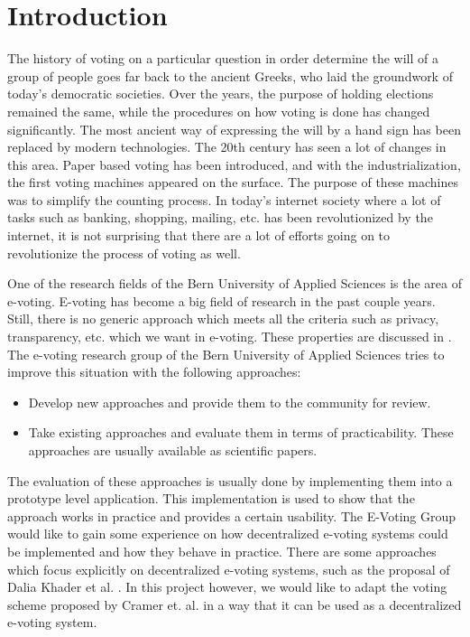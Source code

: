 \documentclass[numbers=noenddot, abstract=on, a4paper, headsepline,
footsepline, oneside, draft=off]{scrreprt}
\begin{document}
\printnomenclature

\chapter{Introduction}
\label{cha:introduction}
The history of voting on a particular question in order determine the will of a
group of people goes far back to the ancient Greeks, who laid the groundwork of
today's democratic societies. Over the years, the purpose of holding elections
remained the same, while the procedures on how voting is done has changed
significantly. The most ancient way of expressing the will by a hand sign has
been replaced by modern technologies. The 20th century has seen a lot of changes
in this area. Paper based voting has been introduced, and with the
industrialization, the first voting machines appeared on the surface. The
purpose of these machines was to simplify the counting process. In today's internet
society where a lot of tasks such as banking, shopping, mailing, etc. has been
revolutionized by the internet, it is not surprising that there are a lot of
efforts going on to revolutionize the process of voting as well.

One of the research fields of the Bern University of Applied Sciences is the
area of e-voting. E-voting has become a big field of research in the past couple
years. Still, there is no generic approach which meets all the criteria such as
privacy, transparency, etc. which we want in e-voting. These properties are
discussed in . The e-voting research group of the Bern
University of Applied Sciences \cite{www:EVG} tries to improve this situation with the following approaches:
\begin{itemize}
  \item Develop new approaches and provide them to the community for review.
  \item Take existing approaches and evaluate them in terms of practicability.
  These approaches are usually available as scientific papers.
\end{itemize}

The evaluation of these approaches is usually done by implementing them into a
prototype level application. This implementation is used to show that the
approach works in practice and provides a certain usability. The E-Voting Group
would like to gain some experience on how decentralized e-voting systems could
be implemented and how they behave in practice. There are some approaches which
focus explicitly on decentralized e-voting systems, such as the proposal of
Dalia Khader et al. \cite{HKRS12}. In this project however, we would like to adapt the
voting scheme proposed by Cramer et. al. \cite{CGS97} in a way that it can be
used as a decentralized e-voting system.
\end{document}
